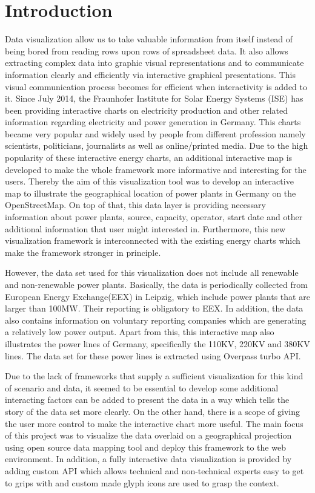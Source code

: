 \chapter{Introduction}

Data visualization allow us to take valuable information from itself instead of being bored from reading rows upon rows of spreadsheet data. It also allows extracting complex data into graphic visual representations and to communicate information clearly and efficiently via interactive graphical presentations. This visual communication process becomes for efficient when interactivity is added to it. Since July 2014, the Fraunhofer Institute for Solar Energy Systems (ISE) has been providing interactive charts on electricity production and other related information regarding electricity and power generation in Germany. This charts became very popular and widely used by people from different profession namely scientists, politicians, journalists as well as online/printed media. Due to the high popularity of these interactive energy charts, an additional interactive map is developed to make the whole framework more informative and interesting for the users. Thereby the aim of this visualization tool was to develop an interactive map to illustrate the geographical location of power plants in Germany on the OpenStreetMap. On top of that, this data layer is providing necessary information about power plants, source, capacity, operator, start date and other additional information that user might interested in. Furthermore, this new visualization framework is interconnected with the existing energy charts which make the framework stronger in principle.

However, the data set used for this visualization does not include all renewable and non-renewable power plants. Basically, the data is periodically collected from European Energy Exchange(EEX) in Leipzig, which include power plants that are larger than 100MW. Their reporting is obligatory to EEX. In addition, the data also contains information on voluntary reporting companies which are generating a relatively low power output. Apart from this, this interactive map also illustrates the power lines of Germany, specifically the 110KV, 220KV and 380KV lines. The data set for these power lines is extracted using Overpass turbo API. 

Due to the lack of frameworks that supply a sufficient visualization for this kind of scenario and data, it seemed to be essential to develop some additional interacting factors can be added to present the data in a way which tells the story of the data set more clearly. On the other hand, there is a scope of giving the user more control to make the interactive chart more useful. The main focus of this project was to visualize the data overlaid on a geographical projection using open source data mapping tool and deploy this framework to the web environment. In addition, a fully interactive data visualization is provided by adding custom API which allows technical and non-technical experts easy to get to grips with and custom made glyph icons are used to grasp the context.
 
